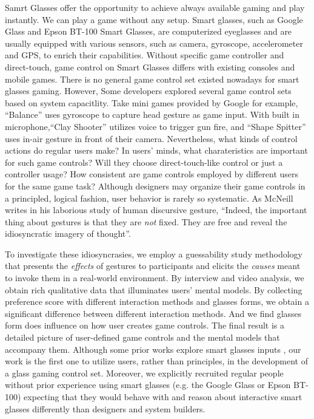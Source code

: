 \documentclass{sigchi}
\begin{document}
Samrt Glasses offer the opportunity to achieve always available gaming and play instantly. We can play a game without any setup. Smart glasses, such as Google Glass and Epson BT-100 Smart Glasses, are computerized eyeglasses and are usually equipped with various sensors, such as camera, gyroscope, accelerometer and GPS, to enrich their capabilities. 
Without specific game controller and direct-touch, game control on Smart Glasses differs with existing consoles and mobile games. There is no general game control set existed nowadays for smart glasses gaming. However, Some developers explored several game control sets based on system capacitlity. Take mini games \cite{MiniGames} provided by Google for example, ``Balance'' uses gyroscope to capture head gesture as game input. With built in microphone,``Clay Shooter'' utilizes voice to trigger gun fire, and ``Shape Spitter'' uses in-air gesture in front of their camera.  
Nevertheless, what kinds of control actions do regular users make? In users' minds, what charateristics are important for such game controls? Will they choose direct-touch-like control or just a controller usage? How consistent are game controls employed by different users for the same game task? 
Although designers may organize their game controls in a principled, logical fashion, user behavior is rarely so systematic. As McNeill \cite{HandAndMind} writes in his laborious study of human discursive gesture, ``Indeed, the important thing about gestures is that they are \emph{not} fixed. They are free and reveal the idiosyncratic imagery of thought''.

To investigate these idiosyncrasies, we employ a guessability study methodology \cite{Wobbrock:2005:MGS:1056808.1057043} that presents the \emph{effects} of gestures to participants and elicits the \emph{causes} meant to invoke them in a real-world environment. By interview and video analysis, we obtain rich qualitative data that illuminates users' mental models. By collecting preference score with different interaction methods and glasses forms, we obtain a significant difference between different interaction methods. And we find glasses form does influence on how user creates game controls. The final result is a detailed picture of user-defined game controls and the mental models that accompany them. Although some prior works explore smart glasses inputs \cite{Colaco:2013:MCL:2501988.2502042,Serrano:2014:EUH:2611247.2556984}, our work is the first one to utilize users, rather than principles, in the development of a glass gaming control set. Moreover, we explicitly recruited regular people without prior experience using smart glasses (e.g. the Google Glass or Epson BT-100) expecting that they would behave with and reason about interactive smart glasses differently than designers and system builders.
\end{document}
